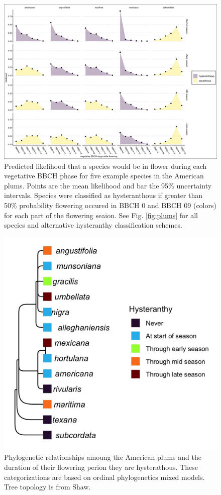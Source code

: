 \documentclass{article}[11pt]
\begin{document}
\begin{figure}[h!]
    \centering
 \includegraphics[width=\textwidth]{..//..//Plots/ord_quants_exmpsps.jpeg}
    \caption{Predicted likelihood that a species would be in flower during each vegetative BBCH phase for five example species in the American plums. Points are the mean likelihood and bar the 95\% uncertainty intervals. Species were classified as hysteranthous if greater than 50\% probability flowering occured in BBCH 0 and BBCH 09 (colors) for each part of the flowering seaion.
  See Fig. \ref{fig:plums} for all species and alternative hysteranthy classification schemes. }
    \label{fig:ordinals}
\end{figure}



\begin{figure}[h!]
    \centering
 \includegraphics[width=.6\textwidth]{..//..//Plots/phylosig2.jpeg}
    \caption{Phylogenetic relationships amoung the American plums and the duration of their flowering perion they are hysterathous. These categorizations are based on ordinal phylogenetics mixed models. Tree topology is from Shaw.}
    \label{fig:phylo2}
\end{figure}
\end{document}
